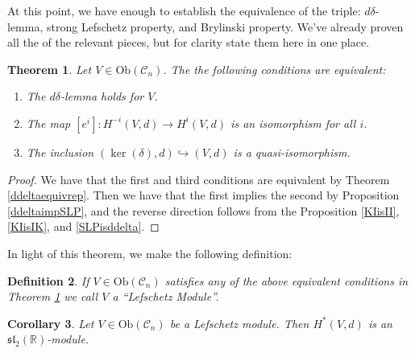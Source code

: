 \documentclass{amsart}
\newcommand{\R}{\mathbb{R}}
\newcommand{\ra}{\rightarrow}
\newtheorem{theorem}{Theorem}
\newtheorem{corollary}[theorem]{Corollary}
\newtheorem{definition}[theorem]{Definition}
\theoremstyle{definition}
\begin{document}
At this point, we have enough to establish the equivalence of the triple: $d\delta$-lemma, strong Lefschetz property, and Brylinski property. We've already proven all the of the relevant pieces, but for clarity state them here in one place.
\begin{theorem}\label{TripleEquiv}
    Let $V \in \mathrm{Ob}(\mathscr{C}_n)$. The the following conditions are equivalent:
    \begin{enumerate}
        \item The $d\delta$-lemma holds for $V$.
        \item The map $[e^i]:H^{-i}(V,d) \ra H^i(V,d)$ is an isomorphism for all $i$.
        \item The inclusion $(\ker(\delta),d) \hookrightarrow (V,d)$ is a quasi-isomorphism.
    \end{enumerate}
\end{theorem}
\begin{proof}
    We have that the first and third conditions are equivalent by Theorem \ref{ddeltaequivrep}. Then we have that the first implies the second by Proposition \ref{ddeltaimpSLP}, and the reverse direction follows from the Proposition \ref{KIisII}, \ref{KIisIK}, and \ref{SLPisddelta}.
\end{proof}
In light of this theorem, we make the following definition:
\begin{definition}
     If $V \in \mathrm{Ob}(\mathscr{C}_n)$ satisfies any of the above equivalent conditions in Theorem \ref{TripleEquiv} we call $V$ a ``Lefschetz Module''.
\end{definition}
\begin{corollary}\label{lefschetzgivessl2coho}
    Let $V \in \mathrm{Ob}(\mathscr{C}_n)$ be a Lefschetz module. Then $H^*(V,d)$ is an $\mathfrak{sl}_2(\R)$-module.
\end{corollary}
\end{document}
